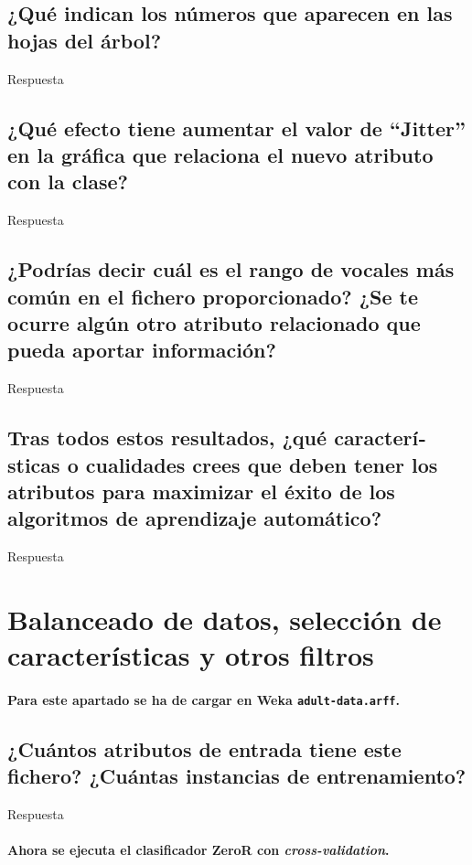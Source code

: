 \documentclass[12pt]{article}
\begin{document}
\subsection{\small ¿Qué indican los números que aparecen en las hojas del árbol?}

Respuesta

\subsection{\small ¿Qué efecto tiene aumentar el valor de ``Jitter'' en la gráfica que
relaciona el nuevo atributo con la clase?}

Respuesta

\subsection{\small ¿Podrí­as decir cuál es el rango de vocales más común en el fichero
proporcionado? ¿Se te ocurre algún otro atributo relacionado que pueda aportar
información?}

Respuesta

\subsection{\small Tras todos estos resultados, ¿qué caracterí­sticas o cualidades
crees que deben tener los atributos para maximizar el éxito de los algoritmos
de aprendizaje automático?}

Respuesta

\newpage

\section{Balanceado de datos, selección de caracterí­sticas y otros filtros}

\paragraph{\small Para este apartado se ha de cargar en Weka \texttt{adult-data.arff}.}

\subsection{\small ¿Cuántos atributos de entrada tiene este fichero? ¿Cuántas
instancias de entrenamiento?}

Respuesta

\paragraph{\small Ahora se ejecuta el clasificador ZeroR con \emph{cross-validation}.}
\end{document}
